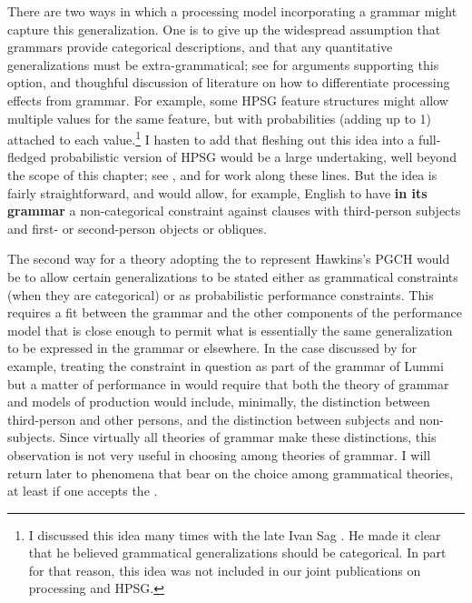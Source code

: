 \documentclass[a4paper]{article}
\begin{document}
There are two ways in which a processing model incorporating a grammar might capture this generalization.  One is to give up the widespread assumption that grammars provide categorical descriptions, and that any quantitative generalizations must be extra-grammatical; see \citet{FrancisPrep} for arguments supporting this option, and thoughful discussion of literature on how to differentiate processing effects from grammar.  For example, some HPSG feature structures might allow multiple values for the same feature, but with probabilities (adding up to 1) attached to each value.\footnote{I discussed this idea many times with the late Ivan Sag .  He made it clear that he believed grammatical generalizations should be categorical.  In part for that reason, this idea was not included in our joint publications on processing and HPSG.}  I hasten to add that fleshing out this idea into a full-fledged probabilistic version of HPSG would be a large undertaking, well beyond the scope of this chapter; see \citet{Linadarki2006}, and \citet{MT2008a-u} for work along these lines.  But the idea is fairly straightforward, and would allow, for example, English to have {\bf in its grammar} a non-categorical constraint against clauses with third-person subjects and first- or second-person objects or obliques.  

The second way for a theory adopting the  to represent Hawkins's PGCH would be to allow certain generalizations to be stated either as grammatical constraints (when they are categorical) or as probabilistic performance constraints.  This requires a fit between the grammar and the other components of the performance model that is close enough to permit what is essentially the same generalization to be expressed in the grammar or elsewhere.  In the case discussed by \citeauthor{BresnanEtAl2001} for example, treating the constraint in question as part of the grammar of Lummi but a matter of performance in  would require that both the theory of grammar and models of production would include, minimally, the distinction between third-person and other persons, and the distinction between subjects and non-subjects.  Since virtually all theories of grammar make these distinctions, this observation is not very useful in choosing among theories of grammar.  I will return later to phenomena that bear on the choice among grammatical theories, at least if one accepts the .
\end{document}
